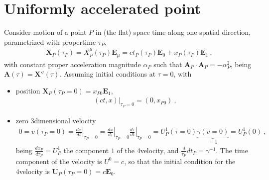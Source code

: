 \documentclass[letterpaper,10pt,english]{jupyterBook}
\begin{document}
\section{Uniformly accelerated point}
\label{\detokenize{ch/relativity-special/rindler:uniformly-accelerated-point}}\label{\detokenize{ch/relativity-special/rindler:relativity-special-rindler-point-uniform-acceleration}}
\sphinxAtStartPar
Consider motion of a point \(P\) in (the flat) space time along one spatial direction, parametrized with proper\sphinxhyphen{}time \(\tau_P\),
\begin{equation*}
\begin{split}\mathbf{X}_P(\tau_P) = X^\mu_P(\tau_P) \mathbf{E}_{\mu} =  ct_P(\tau_P) \mathbf{E}_0 + x_P(\tau_P) \mathbf{E}_1 \ ,\end{split}
\end{equation*}
\sphinxAtStartPar
with constant proper acceleration magnitude \(\alpha_P\) such that \(\mathbf{A}_P \cdot \mathbf{A}_P = -\alpha_P^2\), being \(\mathbf{A}(\tau) = \mathbf{X}''(\tau)\). Assuming initial conditions at \(\tau = 0\), with
\begin{itemize}
\item {} 
\sphinxAtStartPar
position \(\mathbf{X}_P(\tau_P=0) = x_{P0} \mathbf{E}_1\),
\begin{equation*}
\begin{split}(c t, x)|_{\tau_P=0} = (0, x_{P0}) \ ,\end{split}
\end{equation*}
\item {} 
\sphinxAtStartPar
zero 3\sphinxhyphen{}dimensional velocity
\begin{equation*}
\begin{split}0 = v(\tau_P = 0) = \left.\frac{d x}{dt}\right|_{\tau_P=0} = \left.\frac{d x}{d \tau}\right|_{\tau_P=0} \left.\frac{d \tau}{d t}\right|_{\tau_P=0} = U^1_P(\tau=0) \underbrace{ \gamma(v=0) }_{ = 1} = U_P^1(0) \ , \end{split}
\end{equation*}
\sphinxAtStartPar
being \(\tfrac{d x_P}{d \tau_P} = U^1_P\) the component \(1\) of the 4\sphinxhyphen{}velocity, and \(\tfrac{d}{\tau_P}{d t_P} = \gamma^{-1}\). The time component of the velocity is \(U^0 = c\), so that the initial condition for the 4\sphinxhyphen{}velocity is \(\mathbf{U}_P(\tau_P = 0) = c \mathbf{E}_0\).

\end{itemize}
\end{document}

